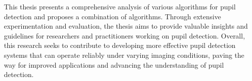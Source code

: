 This thesis presents a comprehensive analysis of various algorithms for pupil detection and proposes a combination of algorithms. Through extensive experimentation and evaluation, the thesis aims to provide valuable insights and guidelines for researchers and practitioners working on pupil detection. Overall, this research seeks to contribute to developing more effective pupil detection systems that can operate reliably under varying imaging conditions, paving the way for improved applications and advancing the understanding of pupil detection. 
